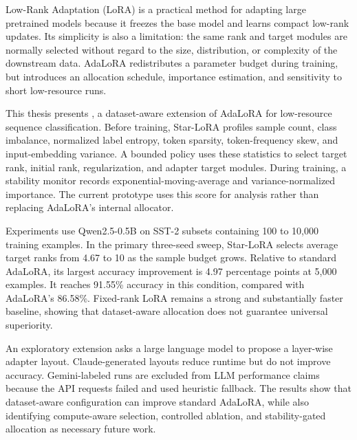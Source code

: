 \begin{eabstract}
Low-Rank Adaptation (LoRA) is a practical method for adapting large pretrained models because it
freezes the base model and learns compact low-rank updates. Its simplicity is also a limitation:
the same rank and target modules are normally selected without regard to the size, distribution,
or complexity of the downstream data. AdaLoRA redistributes a parameter budget during training,
but introduces an allocation schedule, importance estimation, and sensitivity to short
low-resource runs.

This thesis presents \starlora, a dataset-aware extension of AdaLoRA for low-resource sequence
classification. Before training, Star-LoRA profiles sample count, class imbalance, normalized
label entropy, token sparsity, token-frequency skew, and input-embedding variance. A bounded policy
uses these statistics to select target rank, initial rank, regularization, and adapter target
modules. During training, a stability monitor records exponential-moving-average and
variance-normalized importance. The current prototype uses this score for analysis rather than
replacing AdaLoRA's internal allocator.

Experiments use Qwen2.5-0.5B on SST-2 subsets containing 100 to 10,000 training examples. In the
primary three-seed sweep, Star-LoRA selects average target ranks from 4.67 to 10 as the sample
budget grows. Relative to standard AdaLoRA, its largest accuracy improvement is 4.97 percentage
points at 5,000 examples. It reaches 91.55\% accuracy in this condition, compared with AdaLoRA's
86.58\%. Fixed-rank LoRA remains a strong and substantially faster baseline, showing that
dataset-aware allocation does not guarantee universal superiority.

An exploratory extension asks a large language model to propose a layer-wise adapter layout.
Claude-generated layouts reduce runtime but do not improve accuracy. Gemini-labeled runs are
excluded from LLM performance claims because the API requests failed and used heuristic fallback.
The results show that dataset-aware configuration can improve standard AdaLoRA, while also
identifying compute-aware selection, controlled ablation, and stability-gated allocation as
necessary future work.
\end{eabstract}
